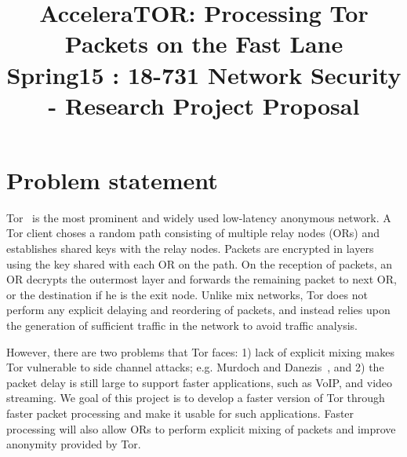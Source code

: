\documentclass[conference]{IEEEtran}
\begin{document}
\title{AcceleraTOR: Processing Tor Packets on the Fast Lane\\ 
  {\Large Spring15 : 18-731 Network Security - Research Project Proposal}
}

\author{
\and
{}
\and
{}
\and
{}
}

\maketitle

%

%
\section{Problem statement}
Tor~\cite{Dingledine:2004:TSO:1251375.1251396} is the most prominent and widely used low-latency anonymous network. A Tor client choses a  random path consisting of multiple relay nodes (ORs) and  establishes shared keys with the relay nodes. Packets are encrypted in layers using the key shared with each OR on the path. On the reception of packets,  an OR decrypts the outermost layer  and forwards the remaining packet to next OR, or the destination if he is the exit node. Unlike mix networks, Tor does not perform any explicit delaying and reordering of packets, and instead relies upon the  generation of sufficient traffic in the network to avoid traffic analysis. 

However, there are two problems that Tor faces: 1) lack of explicit mixing makes Tor vulnerable to side channel attacks; e.g. Murdoch and Danezis~\cite{Murdoch:2005:LTA:1058433.1059390}, and 2) the packet delay is still large to support faster applications, such as VoIP, and video streaming. We goal of this project is  to develop a faster version of Tor through faster packet processing and make it usable for such applications. Faster processing will also allow ORs to perform explicit mixing of packets and improve anonymity provided by Tor.
\end{document}

